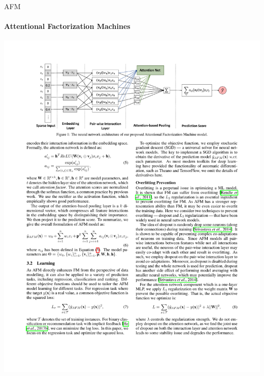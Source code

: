 \documentclass{ctexbeamer}
\begin{document}
\begin{frame}{AFM}
	\framesubtitle{Attentional Factorization Machines }
	\begin{center}
		\includegraphics[width=\textwidth]{framework/afm}
	\end{center}

\end{frame}
\end{document}
